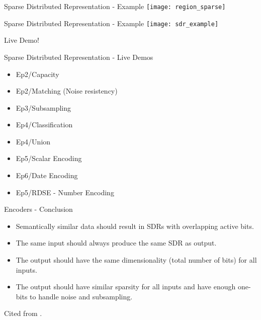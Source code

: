 \begin{frame}[c]{Sparse Distributed Representation - Example}
    \texttt{[image: region\_sparse]}
\end{frame}


\begin{frame}[c]{Sparse Distributed Representation - Example}
    \texttt{[image: sdr\_example]}
\end{frame}



\begin{frame}[c,standout]
    Live Demo!
\end{frame}


\begin{frame}[c]{Sparse Distributed Representation - Live Demos}
    \Large
    \begin{itemize}[<+(1)->]
        \item Ep2/Capacity
        \item Ep2/Matching (Noise resistency)
        \item Ep3/Subsampling
        \item Ep4/Classification
        \item Ep4/Union
        \item Ep5/Scalar Encoding
        \item Ep6/Date Encoding
        \item Ep5/RDSE - Number Encoding
    \end{itemize}
\end{frame}


\begin{frame}[c]{Encoders - Conclusion}
    \begin{itemize}[<+(1)->]
        \item Semantically similar data should result in SDRs with overlapping active bits.
        \item The same input should always produce the same SDR as output.
        \item The output should have the same dimensionality (total number of bits) for all inputs.
        \item The output should have similar sparsity for all inputs and have enough one-bits to handle noise and subsampling.
    \end{itemize}

    \normalsize
    \pause
    Cited from \cite{hawkins2017book}.
\end{frame}


